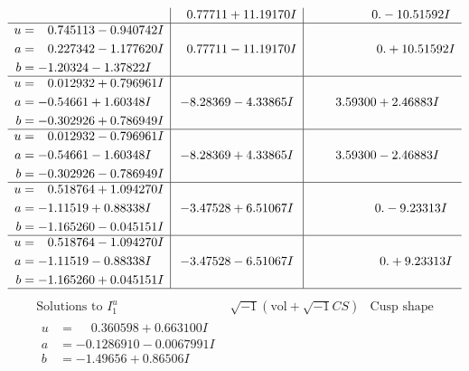 \documentclass[1p]{elsarticle_modified}
\theoremstyle{definition}
\newcommand{\I}{\sqrt{-1}}
\begin{document}
$$\begin{array}{c|c|c}
 & \phantom{-}0.77711 + 11.19170 I & \phantom{-0.000000 } 0. - 10.51592 I \\ \hline\begin{aligned}
u &= \phantom{-}0.745113 - 0.940742 I \\
a &= \phantom{-}0.227342 - 1.177620 I \\
b &= -1.20324 - 1.37822 I\end{aligned}
 & \phantom{-}0.77711 - 11.19170 I & \phantom{-0.000000 -}0. + 10.51592 I \\ \hline\begin{aligned}
u &= \phantom{-}0.012932 + 0.796961 I \\
a &= -0.54661 + 1.60348 I \\
b &= -0.302926 + 0.786949 I\end{aligned}
 & -8.28369 - 4.33865 I & \phantom{-}3.59300 + 2.46883 I \\ \hline\begin{aligned}
u &= \phantom{-}0.012932 - 0.796961 I \\
a &= -0.54661 - 1.60348 I \\
b &= -0.302926 - 0.786949 I\end{aligned}
 & -8.28369 + 4.33865 I & \phantom{-}3.59300 - 2.46883 I \\ \hline\begin{aligned}
u &= \phantom{-}0.518764 + 1.094270 I \\
a &= -1.11519 + 0.88338 I \\
b &= -1.165260 - 0.045151 I\end{aligned}
 & -3.47528 + 6.51067 I & \phantom{-0.000000 } 0. - 9.23313 I \\ \hline\begin{aligned}
u &= \phantom{-}0.518764 - 1.094270 I \\
a &= -1.11519 - 0.88338 I \\
b &= -1.165260 + 0.045151 I\end{aligned}
 & -3.47528 - 6.51067 I & \phantom{-0.000000 -}0. + 9.23313 I\\
 \hline 
 \end{array}$$\newpage$$\begin{array}{c|c|c}  
\text{Solutions to }I^u_{1}& \I (\text{vol} + \sqrt{-1}CS) & \text{Cusp shape}\\
 \hline 
\begin{aligned}
u &= \phantom{-}0.360598 + 0.663100 I \\
a &= -0.1286910 - 0.0067991 I \\
b &= -1.49656 + 0.86506 I\end{aligned}

\end{array}$$
\end{document}
